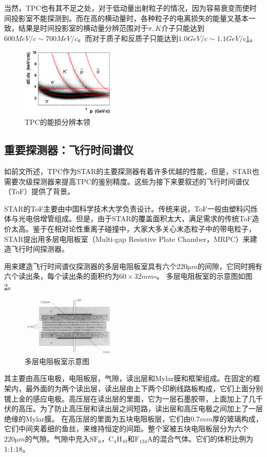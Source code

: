 \documentclass[%
 reprint,
 amsmath,amssymb,
 aps,
]{revtex4-1}
\begin{document}
当然，TPC也有其不足之处，对于低动量出射粒子的情况，因为容易衰变而使时间投影室不能探测到。而在高的横动量时，各种粒子的电离损失的能量又基本一致，结果是时间投影室的横动量分辨范围对于$\pi,K$介子只能达到 $600\si{MeV\per c}\sim700\si{MeV\per c}$。而对于质子和反质子只能达到$1.0\si{GeV\per c}\sim1.1\si{GeV\per c}$\ref{fig:dEdx}。
\begin{figure}[htbp]
    \includegraphics[width=0.4\textwidth]{Plots/dEdx.png}
    \caption{\label{fig:dEdx}TPC的能损分辨本领}
\end{figure}
\subsection{\label{sec:ToF}重要探测器：飞行时间谱仪}
如前文所述，TPC作为STAR的主要探测器有着许多优越的性能，但是，STAR也需要次级探测器来提高TPC的鉴别精度。这些为接下来要叙述的飞行时间谱仪（ToF）提供了背景。

STAR的ToF主要由中国科学技术大学负责设计。传统来说，ToF一般由塑料闪烁体与光电倍增管组成。但是，由于STAR的覆盖面积太大，满足需求的传统ToF造价太高。鉴于在相对论性重离子碰撞中，大家大多关心末态粒子中的带电粒子，STAR提出用多层电阻板室（Multi-gap Resistive Plate Chamber，MRPC）来建造飞行时间探测器。

用来建造飞行时间谱仪探测器的多层电阻板室具有六个220$\si{\micro m}$的间隙，它同时拥有六个读出条，每个读出条的面积约为$60\times32\si{mm\square}$。 多层电阻板室的示意图如图\ref{fig:MRPC}。
\begin{figure}[htbp]
    \includegraphics[width=0.4\textwidth]{Plots/MRPC.png}
    \caption{\label{fig:MRPC}多层电阻板室示意图}
\end{figure}
其主要由高压电极，电阻板层，气隙，读出层和Mylar膜和框架组成。在固定的框架内，最外面的为两个读出层，读出层由上下两个印刷线路板构成，它们上面分别镀上金的感应电极。高压层在读出层的里面，它为一层石墨胶带，上面加上了几千伏的高压。为了防止高压层和读出层之间短路，读出层和高压电极之间加上了一层绝缘的Mylar膜。 在高压层的里面为五块电阻板层，它们由$0.7\si{mm}$厚的玻璃构成，它们中间夹着细的鱼丝，来维持恒定的间距。整个室被五块电阻板层分为六个$220\si{\micro m}$的气隙。气隙中充入$\text{SF}_6$，$\text{C}_4\text{H}_{10}$和$\text{F}_{134}\text{A}$的混合气体。它们的体积比例为1:1:18。
\end{document}
